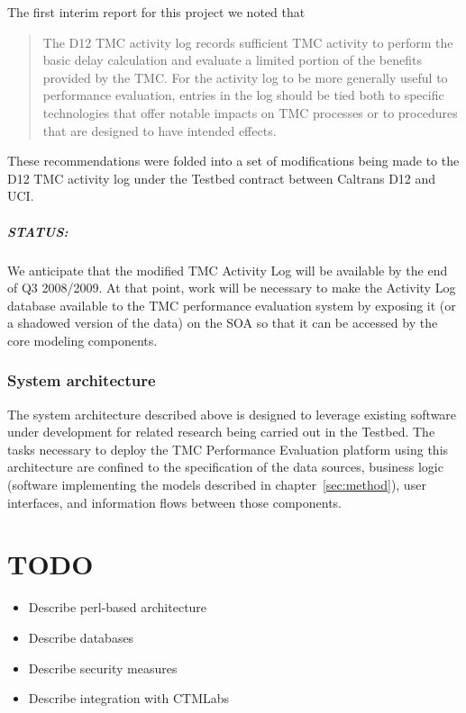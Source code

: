 \documentclass[12pt]{report}
\begin{document}
The first interim report for this project
\citep{rindt08:_measur_based_system_for_tmc_perfor_evaluat}
we noted that
\begin{quote}
  The D12 TMC activity log records sufficient TMC activity to perform
  the basic delay calculation and evaluate a limited portion of the
  benefits provided by the TMC. For the activity log to be more
  generally useful to performance evaluation, entries in the log
  should be tied both to specific technologies that offer notable
  impacts on TMC processes or to procedures that are designed to have
  intended effects.
\end{quote}
These recommendations were folded into a set of modifications being
made to the D12 TMC activity log under the Testbed contract between
Caltrans D12 and UCI.  

\paragraph{STATUS:} We anticipate that the modified TMC Activity Log
will be available by the end of Q3 2008/2009.  At that point, work
will be necessary to make the Activity Log database available to the
TMC performance evaluation system by exposing it (or a shadowed
version of the data) on the SOA so that it can be accessed by the core
modeling components.


\subsection{System architecture}
\label{sec:arch}

The system architecture described above is designed to leverage
existing software under development for related research being carried
out in the Testbed.  The tasks necessary to deploy the TMC Performance
Evaluation platform using this architecture are confined to the
specification of the data sources, business logic (software
implementing the models described in chapter~\ref{sec:method}), user
interfaces, and information flows between those components.


\chapter{TODO}
\begin{itemize}
\item Describe perl-based architecture
\item Describe databases
\item Describe security measures
\item Describe integration with CTMLabs
\end{itemize}








\end{document}
